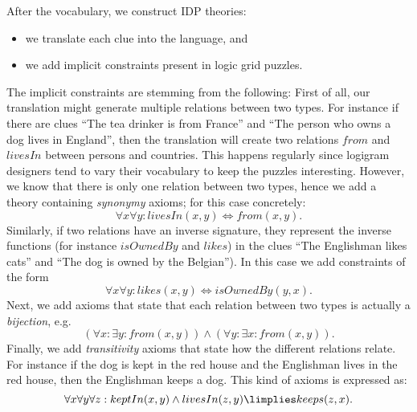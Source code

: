 
After the vocabulary, we construct IDP theories: 
\begin{itemize}
 \item we translate each clue into the \idp language, and
 \item we add implicit constraints present in logic grid puzzles.
\end{itemize}

The implicit constraints are stemming from the following: First of all, our translation might generate multiple relations between two types. For instance if there are clues ``The tea drinker is from France'' and ``The person who owns a dog lives in England'', then the translation will create two relations $\mathit{from}$ and $\mathit{livesIn}$ between persons and countries. This happens regularly since logigram designers tend to vary their vocabulary to keep the puzzles interesting. However, we know that there is only one relation between two types, hence we add a theory containing \emph{synonymy} axioms; for this case concretely: 
\[\forall x \forall y : livesIn(x, y) \Leftrightarrow from(x, y).\]
Similarly, if two relations have an inverse signature, they represent the inverse functions (for instance $\mathit{isOwnedBy}$ and $\mathit{likes}$) in the clues ``The Englishman likes cats'' and ``The dog is owned by the Belgian''). In this case we add constraints of the form
\[\forall x \forall y : likes(x, y) \Leftrightarrow isOwnedBy(y,x).\]
Next, we add axioms that state that each relation between two types is actually a \emph{bijection}, e.g. 
\[(\forall x : \exists y : from(x, y)) \land (\forall y : \exists x : from(x, y)).\]
Finally, we add \emph{transitivity} axioms that state how the different relations relate. For instance if the dog is kept in the red house and the Englishman lives in the red house, then the Englishman keeps a dog. This kind of axioms is expressed as:
\[
 \forall x \forall y \forall z: keptIn(x,y) \land livesIn(z,y) \limplies keeps(z,x).
\]


